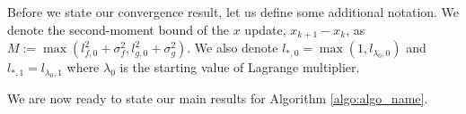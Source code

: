 





Before we state our convergence result, let us define some additional notation. We denote the second-moment bound of the $x$ update, $x_{k+1} - x_k$, as $M := \max(l_{f,0}^2 + \sigma_f^2, l_{g,0}^2 + \sigma_g^2)$. We also denote $l_{*,0} = \max(1, l_{\lambda_0,0})$ %
and $l_{*,1} = l_{\lambda_0,1}$ where $\lambda_0$ is the starting value of Lagrange multiplier. 

We are now ready to state our main results for Algorithm \ref{algo:algo_name}.




